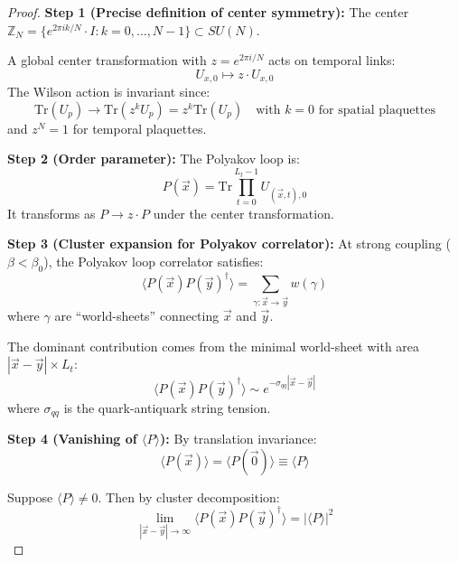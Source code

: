 \begin{proof}
\textbf{Step 1 (Precise definition of center symmetry):}
The center $\mathbb{Z}_N = \{e^{2\pi i k/N} \cdot I : k = 0, \ldots, N-1\} \subset SU(N)$.

A global center transformation with $z = e^{2\pi i/N}$ acts on temporal links:
\begin{equation}
U_{x,0} \mapsto z \cdot U_{x,0}
\end{equation}
The Wilson action is invariant since:
\begin{equation}
\mathrm{Tr}(U_p) \to \mathrm{Tr}(z^k U_p) = z^k \mathrm{Tr}(U_p) \quad \text{with } k = 0 \text{ for spatial plaquettes}
\end{equation}
and $z^N = 1$ for temporal plaquettes.

\textbf{Step 2 (Order parameter):}
The Polyakov loop is:
\begin{equation}
P(\vec{x}) = \mathrm{Tr} \prod_{t=0}^{L_t - 1} U_{(\vec{x}, t), 0}
\end{equation}
It transforms as $P \to z \cdot P$ under the center transformation.

\textbf{Step 3 (Cluster expansion for Polyakov correlator):}
At strong coupling ($\beta < \beta_0$), the Polyakov loop correlator satisfies:
\begin{equation}
\langle P(\vec{x}) P(\vec{y})^\dagger \rangle = \sum_{\gamma: \vec{x} \to \vec{y}} w(\gamma)
\end{equation}
where $\gamma$ are ``world-sheets'' connecting $\vec{x}$ and $\vec{y}$.

The dominant contribution comes from the minimal world-sheet with area $|\vec{x} - \vec{y}| \times L_t$:
\begin{equation}
\langle P(\vec{x}) P(\vec{y})^\dagger \rangle \sim e^{-\sigma_{qq} |\vec{x} - \vec{y}|}
\end{equation}
where $\sigma_{qq}$ is the quark-antiquark string tension.

\textbf{Step 4 (Vanishing of $\langle P \rangle$):}
By translation invariance:
\begin{equation}
\langle P(\vec{x}) \rangle = \langle P(\vec{0}) \rangle \equiv \langle P \rangle
\end{equation}

Suppose $\langle P \rangle \neq 0$. Then by cluster decomposition:
\begin{equation}
\lim_{|\vec{x} - \vec{y}| \to \infty} \langle P(\vec{x}) P(\vec{y})^\dagger \rangle = |\langle P \rangle|^2
\end{equation}


\end{proof}
